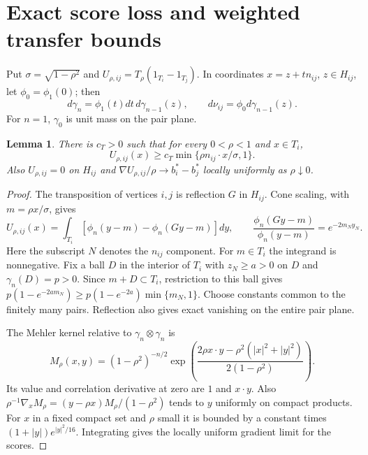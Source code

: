 \documentclass[11pt,reqno]{amsart}
\newtheorem{lemma}[theorem]{Lemma}
\newcommand{\ga}{\gamma}
\begin{document}
\section{Exact score loss and weighted transfer bounds}\label{sec:tails}

Put $\sigma=\sqrt{1-\rho^2}$ and
$U_{\rho,ij}=T_\rho(1_{T_i}-1_{T_j})$. In coordinates
$x=z+tn_{ij}$, $z\in H_{ij}$, let $\phi_0=\phi_1(0)$; then
\[
 d\ga_n=\phi_1(t)dt\,d\ga_{n-1}(z),\qquad
 d\nu_{ij}=\phi_0d\ga_{n-1}(z).
\]
For $n=1$, $\ga_0$ is unit mass on the pair plane.

\begin{lemma}\label{lem:margin}
There is $c_T>0$ such that for every $0<\rho<1$ and $x\in T_i$,
\begin{equation}\label{eq:saturated-margin}
 U_{\rho,ij}(x)\ge c_T\min\{\rho n_{ij}\cdot x/\sigma,1\}.
\end{equation}
Also $U_{\rho,ij}=0$ on $H_{ij}$ and
$\nabla U_{\rho,ij}/\rho\to b_i^*-b_j^*$ locally uniformly as
$\rho\downarrow0$.
\end{lemma}

\begin{proof}
The transposition of vertices $i,j$ is reflection $G$ in $H_{ij}$.
Cone scaling, with $m=\rho x/\sigma$, gives
\[
 U_{\rho,ij}(x)=\int_{T_i}[\phi_n(y-m)-\phi_n(Gy-m)]dy,
 \qquad \frac{\phi_n(Gy-m)}{\phi_n(y-m)}=e^{-2m_Ny_N}.
\]
Here the subscript $N$ denotes the $n_{ij}$ component.
For $m\in T_i$ the integrand is nonnegative. Fix a ball $D$ in the
interior of $T_i$ with $z_N\ge a>0$ on $D$ and $\ga_n(D)=p>0$.
Since $m+D\subset T_i$, restriction to this ball gives
$p(1-e^{-2am_N})\ge p(1-e^{-2a})\min\{m_N,1\}$.
Choose constants common to the finitely many pairs. Reflection also
gives exact vanishing on the entire pair plane.

The Mehler kernel relative to $\ga_n\otimes\ga_n$ is
\begin{equation}\label{eq:mehler}
 M_\rho(x,y)=(1-\rho^2)^{-n/2}
 \exp\!\left(\frac{2\rho x\cdot y-\rho^2(|x|^2+|y|^2)}{2(1-\rho^2)}\right).
\end{equation}
Its value and correlation derivative at zero are $1$ and $x\cdot y$.
Also $\rho^{-1}\nabla_x M_\rho=(y-\rho x)M_\rho/(1-\rho^2)$ tends
to $y$ uniformly on compact products. For $x$ in a fixed compact
set and $\rho$ small it is bounded by a constant times
$(1+|y|)e^{|y|^2/16}$. Integrating gives the locally uniform gradient
limit for the scores.
\end{proof}
\end{document}
